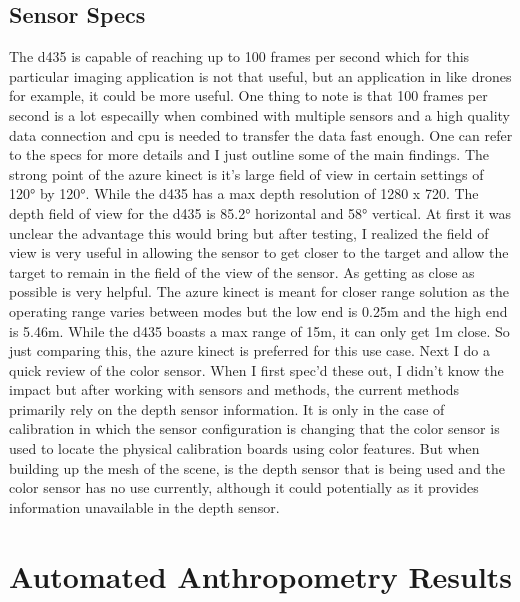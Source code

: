 \subsection{Sensor Specs}
The d435 is capable of reaching up to 100 frames per second which for this particular imaging application is not that useful, but an application in like drones for example, it could be more useful. One thing to note is that 100 frames per second is a lot especailly when combined with multiple sensors and a high quality data connection and cpu is needed to transfer the data fast enough. One can refer to the specs for more details and I just outline some of the main findings. The strong point of the azure kinect is it's large field of view in certain settings of \ang{120} by \ang{120}. While the d435 has a max depth resolution of 1280 x 720. The depth field of view for the d435 is \ang{85.2} horizontal and \ang{58} vertical. At first it was unclear the advantage this would bring but after testing, I realized the field of view is very useful in allowing the sensor to get closer to the target and allow the target to remain in the field of the view of the sensor. As getting as close as possible is very helpful. The azure kinect is meant for closer range solution as the operating range varies between modes but the low end is 0.25m and the high end is 5.46m. While the d435 boasts a max range of 15m, it can only get 1m close. So just comparing this, the azure kinect is preferred for this use case. Next I do a quick review of the color sensor. When I first spec'd these out, I didn't know the impact but after working with sensors and methods, the current methods primarily rely on the depth sensor information. It is only in the case of calibration in which the sensor configuration is changing that the color sensor is used to locate the physical calibration boards using color features. But when building up the mesh of the scene, is the depth sensor that is being used and the color sensor has no use currently, although it could potentially as it provides information unavailable in the depth sensor.


\section{Automated Anthropometry Results}

